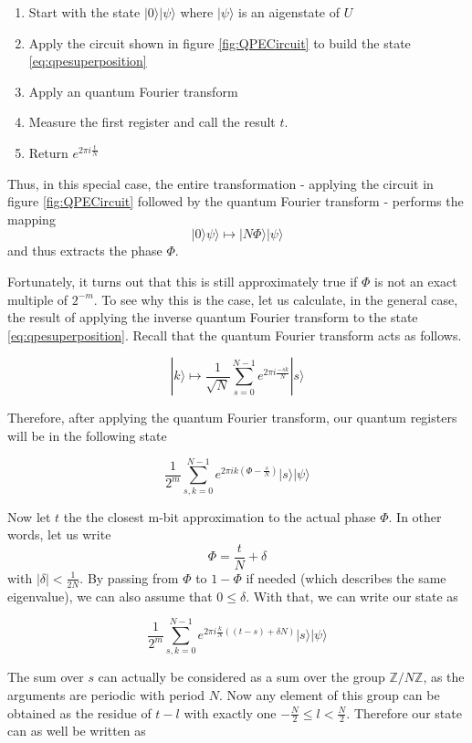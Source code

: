 \documentclass[a4paper, draft]{article}
\theoremstyle{own}
\theoremstyle{remark}
\newcommand{\Z}{\mathbb{Z}}
\begin{document}
\begin{enumerate}
	\item Start with the state  $|0 \rangle |\psi \rangle$ where $|\psi \rangle$ is an aigenstate of $U$
	\item Apply the circuit shown in figure \ref{fig:QPECircuit} to build the state \eqref{eq:qpesuperposition}
	\item Apply an  quantum Fourier transform
	\item Measure the first register and call the result $t$. 
	\item Return $e^{2\pi i \frac{t}{N}}$
\end{enumerate}

Thus, in this special case, the entire transformation - applying the circuit in figure \ref{fig:QPECircuit} followed by the quantum Fourier transform - performs the mapping
$$
|0 \rangle \psi \rangle \mapsto | N \Phi \rangle |\psi \rangle
$$
and thus extracts the phase $\Phi$.

Fortunately, it turns out that this is still approximately true if $\Phi$ is not an exact multiple of $2^{-m}$. To see why this is the case, let us calculate, in the general case, the result of applying the inverse quantum Fourier transform to the state \eqref{eq:qpesuperposition}. Recall that the  quantum Fourier transform acts as follows.

$$
|k \rangle \mapsto \frac{1}{\sqrt{N}} \sum_{s=0}^{N-1} e^{2\pi i \frac{-sk}{N}} |s \rangle
$$

Therefore, after applying the  quantum Fourier transform, our quantum registers will be in the following state

$$
\frac{1}{2^m} \sum_{s,k=0}^{N-1} e^{2\pi i k(\Phi - \frac{s}{N})} |s \rangle |\psi \rangle
$$

Now let $t$ the the closest m-bit approximation to the actual phase $\Phi$. In other words, let us write
$$
\Phi = \frac{t}{N} + \delta
$$
with $|\delta| < \frac{1}{2N}$. By passing from $\Phi$ to 
$1 - \Phi$ if needed (which describes the same eigenvalue), we can also assume that $0 \leq \delta$. With that, we can write our state as

$$
\frac{1}{2^m} \sum_{s,k=0}^{N-1} e^{2\pi i \frac{k}{N}((t-s) + \delta N)} |s \rangle |\psi \rangle
$$

The sum over $s$ can actually be considered as a sum over the group $\Z / N\Z$, as the arguments are periodic with period $N$. Now any element of this group can be obtained as the residue of $t - l$ with exactly one  $-\frac{N}{2} \leq l < \frac{N}{2}$. Therefore our state can as well be written as
\end{document}
